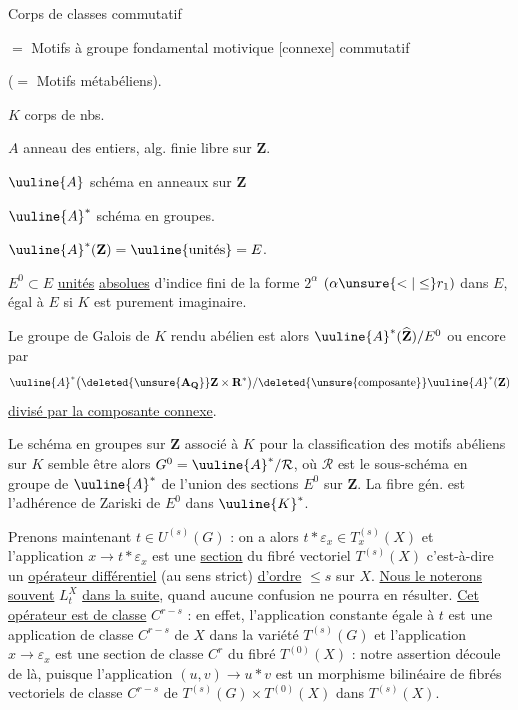 Corps de classes commutatif

$=$ Motifs à groupe fondamental motivique [connexe] commutatif

($=$ Motifs métabéliens).

$K$ corps de nbs.

$A$ anneau des entiers, alg. finie libre sur $\mathbf Z$.

$\uuline{A}$ schéma en anneaux sur $\mathbf Z$

$\uuline{A}^*$ schéma en groupes.

$\uuline{A}^*(\mathbf Z)=\uuline{\text{unités}}=E$.

$E^0\subset E$ \uline{unités} \uline{absolues} d'indice fini de la forme $2^\alpha$ $(\alpha\unsure{<|\leq}r_1)$ dans $E$, égal à $E$ si $K$ est purement imaginaire.

 Le groupe de Galois de $K$ rendu abélien est alors  $\uuline{A}^*(\widehat{\mathbf Z})/E^0$ ou encore par
\[
\uuline{A}^*\bigl(\deleted{\unsure{\mathbf A_{\mathbf Q}}}\mathbf Z\times\mathbf R^*\bigr)/\deleted{\text{\unsure{composante}}}\uuline{A}^*(\mathbf Z)
\]
\uline{divisé par la composante connexe}.

Le schéma en groupes  sur $\mathbf Z$ associé à $K$ pour la classification des motifs abéliens sur $K$ semble être alors $G^0=\uuline{A}^*/\mathcal R$, où $\mathcal R$ est le sous-schéma en groupe de $\uuline{A}^*$  de l'union des sections $E^0$ sur $\mathbf Z$. La fibre gén. est l'adhérence  de Zariski de $E^0$ dans $\uuline{K}^*$.


Prenons maintenant $t\in U^{(s)}(G)$ : on a alors $t*\varepsilon_x\in T_x^{(s)}(X)$ et l'application $x\longrightarrow t*\varepsilon_x$ est une \uline{section} du fibré vectoriel $T^{(s)}(X)$ c'est-à-dire un \uline{opérateur différentiel} (au sens strict) \uline{d'ordre} $\leq s$ sur $X$. \uline{Nous le noterons souvent} $L_t^X$ \uline{dans la suite}, quand aucune confusion ne pourra en résulter. \uline{Cet opérateur est de classe} $C^{r-s}$ : en effet, l'application constante égale à $t$ est une application de classe $C^{r-s}$ de $X$ dans la variété $T^{(s)}(G)$ et l'application $x\longrightarrow\varepsilon_x$ est une section de classe $C^r$ du fibré $T^{(0)}(X)$ : notre assertion découle de là, puisque l'application $(u,v)\longrightarrow u*v$ est un morphisme bilinéaire de fibrés vectoriels de classe $C^{r-s}$ de $T^{(s)}(G)\times T^{(0)}(X)$ dans $T^{(s)}(X)$.

